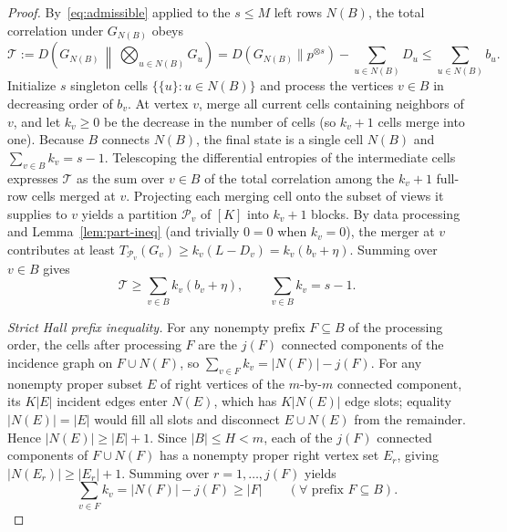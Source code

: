 \documentclass[11pt]{article}
\theoremstyle{plain}
\theoremstyle{definition}
\theoremstyle{remark}
\begin{document}
\begin{proof}
By~\eqref{eq:admissible} applied to the $s \le M$ left rows $N(B)$, the total correlation under $G_{N(B)}$ obeys
\begin{equation}\label{eq:tc-upper}
\mathcal{T} := D\!\left(G_{N(B)} \,\middle\|\, \bigotimes_{u \in N(B)} G_u\right)
= D(G_{N(B)} \| p^{\otimes s}) - \sum_{u \in N(B)} D_u
\le \sum_{u \in N(B)} b_u.
\end{equation}
Initialize $s$ singleton cells $\{\{u\} : u \in N(B)\}$ and process the vertices $v \in B$ in decreasing order of $b_v$.
At vertex $v$, merge all current cells containing neighbors of $v$, and let $k_v \ge 0$ be the decrease in the number of cells (so $k_v + 1$ cells merge into one).
Because $B$ connects $N(B)$, the final state is a single cell $N(B)$ and $\sum_{v \in B} k_v = s - 1$.
Telescoping the differential entropies of the intermediate cells expresses $\mathcal{T}$ as the sum over $v \in B$ of the total correlation among the $k_v + 1$ full-row cells merged at $v$.
Projecting each merging cell onto the subset of views it supplies to $v$ yields a partition $\mathcal{P}_v$ of $[K]$ into $k_v + 1$ blocks.
By data processing and Lemma~\ref{lem:part-ineq} (and trivially $0 = 0$ when $k_v = 0$), the merger at $v$ contributes at least $T_{\mathcal{P}_v}(G_v) \ge k_v(L - D_v) = k_v(b_v + \eta)$.
Summing over $v \in B$ gives
\begin{equation}\label{eq:tc-lower}
\mathcal{T} \ge \sum_{v \in B} k_v(b_v + \eta), \qquad \sum_{v \in B} k_v = s - 1.
\end{equation}

\emph{Strict Hall prefix inequality.}
For any nonempty prefix $F \subseteq B$ of the processing order, the cells after processing $F$ are the $j(F)$ connected components of the incidence graph on $F \cup N(F)$, so $\sum_{v \in F} k_v = |N(F)| - j(F)$.
For any nonempty proper subset $E$ of right vertices of the $m$-by-$m$ connected component, its $K|E|$ incident edges enter $N(E)$, which has $K|N(E)|$ edge slots; equality $|N(E)| = |E|$ would fill all slots and disconnect $E \cup N(E)$ from the remainder.
Hence $|N(E)| \ge |E| + 1$.
Since $|B| \le H < m$, each of the $j(F)$ connected components of $F \cup N(F)$ has a nonempty proper right vertex set $E_r$, giving $|N(E_r)| \ge |E_r| + 1$.
Summing over $r = 1, \dots, j(F)$ yields
\begin{equation}\label{eq:hall}
\sum_{v \in F} k_v = |N(F)| - j(F) \ge |F|
\qquad (\forall\text{ prefix } F \subseteq B).
\end{equation}


\end{proof}
\end{document}
